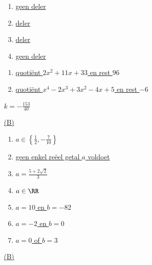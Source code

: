 \documentclass{ximera}
\begin{document}
\begin{Antwoord} \label{antw3.3}
\begin{enumerate}
\item
\hyperlink{oef3.3}{geen deler}
\item
\hyperlink{oef3.3}{deler}
\item
\hyperlink{oef3.3}{deler}
\item
\hyperlink{oef3.3}{geen deler}
\end{enumerate}
\end{Antwoord}

\begin{Antwoord} \label{antw3.4}
\begin{enumerate}
\item
\hyperlink{oef3.4}{quoti\"ent $2x^2+11x+33$ en rest $96$}
\item
\hyperlink{oef3.4}{quoti\"ent $x^4-2x^3+3x^2-4x+5$ en rest $-6$}
\end{enumerate}
\end{Antwoord}

\begin{Antwoord} \label{antw3.5}
\hyperlink{oef3.5}{$k = - \frac{153}{40}$}
\end{Antwoord}

\begin{Antwoord} \label{antw3.6}
\hyperlink{oef3.6}{(B)}
\end{Antwoord}

\begin{Antwoord} \label{antw3.7}
\begin{enumerate}
\item
\hyperlink{oef3.7}{$a \in \left\{\frac{1}{2}, -\frac{7}{10}\right\}$}
\item
\hyperlink{oef3.7}{geen enkel re\"eel getal $a$ voldoet}
\item
\hyperlink{oef3.7}{$a = \frac{5+2\sqrt{2}}{3}$}
\item
\hyperlink{oef3.7}{$a \in \RR$}
\item
\hyperlink{oef3.7}{$a = 10$ en $b = -82$}
\item
\hyperlink{oef3.7}{$a = -2$ en $b = 0$}
\item
\hyperlink{oef3.7}{$a = 0$ of $b = 3$}
\end{enumerate}
\end{Antwoord}

\begin{Antwoord} \label{antw3.8}
\hyperlink{oef3.8}{(B)}
\end{Antwoord}
\end{document}
